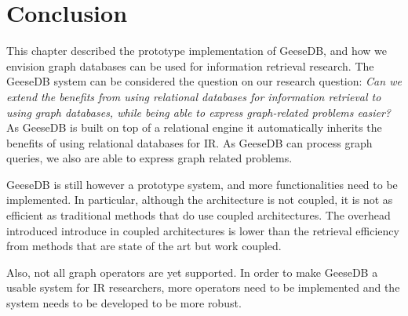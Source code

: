 \section{Conclusion}
This chapter described the prototype implementation of GeeseDB, and how we envision graph databases can be used for information retrieval research.
The GeeseDB system can be considered the question on our research question: \emph{Can we extend the benefits from using relational databases for information retrieval to using graph databases, while being able to express graph-related problems easier?}
As GeeseDB is built on top of a relational engine it automatically inherits the benefits of using relational databases for IR. As GeeseDB can process graph queries, we also are able to express graph related problems. 

GeeseDB is still however a prototype system, and more functionalities need to be implemented. In particular, although the architecture is not coupled, it is not as efficient as traditional methods that do use coupled architectures. The overhead introduced introduce in coupled architectures is lower than the retrieval efficiency from methods that are state of the art but work coupled.

Also, not all graph operators are yet supported. In order to make GeeseDB a usable system for IR researchers, more operators need to be implemented and the system needs to be developed to be more robust. 
 
